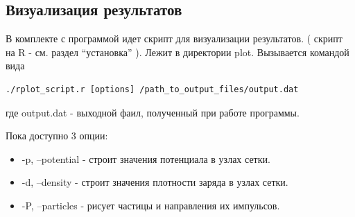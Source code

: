 \subsection{ Визуализация результатов }

В комплекте с программой идет скрипт для визуализации результатов.
( скрипт на R - см. раздел ``установка'' ).
Лежит в директории plot. Вызывается командой вида
\begin{verbatim}
./rplot_script.r [options] /path_to_output_files/output.dat
\end{verbatim}
где output.dat - выходной фаил, полученный при работе программы.

Пока доступно 3 опции: 
\begin{itemize}
\item -p, --potential - строит значения потенциала в узлах сетки.
\item -d, --density - строит значения плотности заряда в узлах сетки.
\item -P, --particles - рисует частицы и направления их импульсов.
\end{itemize}

